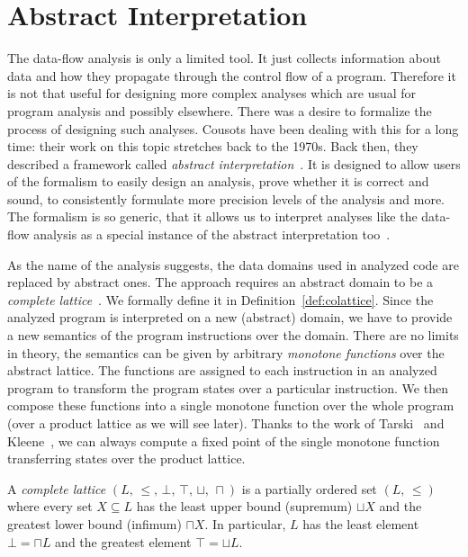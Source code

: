 \section{Abstract Interpretation}\label{sec:ai}
The data-flow analysis is only a limited tool. It just collects information
about data and how they propagate through the control flow of a program.
Therefore it is not that useful for designing more complex analyses which are
usual for program analysis and possibly elsewhere. There was a desire to
formalize the process of designing such analyses. Cousots have been dealing
with this for a long time: their work on this topic stretches back to the
1970s. Back then, they described a framework called \emph{abstract
interpretation}~\cite{cousot}. It is designed to allow users of the formalism
to easily design an analysis, prove whether it is correct and sound, to
consistently formulate more precision levels of the analysis and more. The
formalism is so generic, that it allows us to interpret analyses like the
data-flow analysis as a special instance of the abstract interpretation
too~\cite{ai_intro}.

As the name of the analysis suggests, the data domains used in analyzed code
are replaced by abstract ones. The approach requires an abstract domain to be
a \emph{complete lattice}~\cite{lattice1,lattice2}. We formally define it in
Definition~\ref{def:colattice}. Since the analyzed program is interpreted on a
new (abstract) domain, we have to provide a new semantics of the program
instructions over the domain.  There are no limits in theory, the semantics
can be given by arbitrary \emph{monotone functions} over the abstract lattice.
The functions are assigned to each instruction in an analyzed program to
transform the program states over a particular instruction. We then compose
these functions into a single monotone function over the whole program (over a
product lattice as we will see later).  Thanks to the work of
Tarski~\cite{tarski} and Kleene~\cite[pages 348--349]{kleene}, we can always
compute a fixed point of the single monotone function transferring states over
the product lattice.

\begin{dfn}\label{def:colattice}
A \emph{complete lattice} $(L,\, \leq,\, \bot,\, \top,\, \sqcup,\, \sqcap)$ is
a partially ordered set $(L,\, \leq)$ where every set $X \subseteq L$ has the
least upper bound (supremum) $\sqcup X$ and the greatest lower bound (infimum)
$\sqcap X$. In particular, $L$ has the least element $\bot = \sqcap L$ and the
greatest element $\top = \sqcup L$.
\end{dfn}

